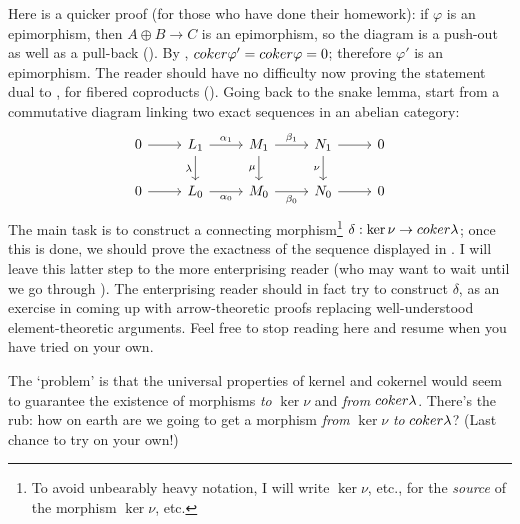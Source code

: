Here is a quicker proof (for those who have done their homework): if
$\varphi$ is an epimorphism, then $A \oplus B \to C$ is an
epimorphism, so the diagram is a push-out as well as a pull-back
(). By
,
$coker\varphi' = coker\varphi = 0$; therefore $\varphi'$ is an
epimorphism. The reader should have no difficulty now proving the
statement dual to , for fibered coproducts
().  Going back to the
snake lemma, start from a commutative diagram linking two exact
sequences in an abelian category:
\[\begin{tikzcd}
    0 \arrow[r] & L_1 \arrow[r, "\alpha_1"] \arrow[d, "\lambda"'] &
    M_1 \arrow[r, "\beta_1"] \arrow[d, "\mu"'] &
    N_1 \arrow[r] \arrow[d, "\nu"'] & 0 \\
    0 \arrow[r] & L_0 \arrow[r, "\alpha_0"'] & M_0 \arrow[r,
    "\beta_0"'] & N_0 \arrow[r] & 0
  \end{tikzcd}\] The main task is to construct a connecting
morphism\footnote{To avoid unbearably heavy notation, I will write
  $\ker\nu$, etc., for the \emph{source} of the morphism $\ker\nu$,
  etc.}  $\delta : \ker\nu \to coker\lambda$; once this is done, we
should prove the exactness of the sequence displayed in
. I will leave this latter step to the
more enterprising reader (who may want to wait until we go through
).
The enterprising reader should in fact try to construct $\delta$, as
an exercise in coming up with arrow-theoretic proofs replacing
well-understood element-theoretic arguments. Feel free to stop reading
here and resume when you have tried on your own.

The `problem' is that the universal properties of kernel and cokernel
would seem to guarantee the existence of morphisms \emph{to} $\ker\nu$
and \emph{from} $coker\lambda$. There's the rub: how on earth are we
going to get a morphism \emph{from} $\ker\nu$ \emph{to}
$coker\lambda$? (Last chance to try on your own!)

